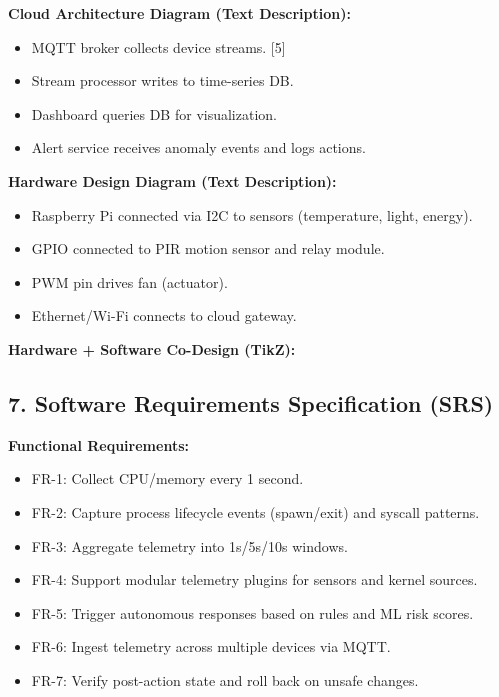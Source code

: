 \documentclass[11pt]{article}
\begin{document}
\textbf{Cloud Architecture Diagram (Text Description):}
\begin{itemize}
    \item MQTT broker collects device streams. [5]
    \item Stream processor writes to time-series DB.
    \item Dashboard queries DB for visualization.
    \item Alert service receives anomaly events and logs actions.
\end{itemize}

\textbf{Hardware Design Diagram (Text Description):}
\begin{itemize}
    \item Raspberry Pi connected via I2C to sensors (temperature, light, energy).
    \item GPIO connected to PIR motion sensor and relay module.
    \item PWM pin drives fan (actuator).
    \item Ethernet/Wi-Fi connects to cloud gateway.
\end{itemize}

\textbf{Hardware + Software Co-Design (TikZ):}
\begin{center}
\end{center}

\subsection{7. Software Requirements Specification (SRS)}
\textbf{Functional Requirements:}
\begin{itemize}
    \item FR-1: Collect CPU/memory every 1 second.
    \item FR-2: Capture process lifecycle events (spawn/exit) and syscall patterns.
    \item FR-3: Aggregate telemetry into 1s/5s/10s windows.
    \item FR-4: Support modular telemetry plugins for sensors and kernel sources.
    \item FR-5: Trigger autonomous responses based on rules and ML risk scores.
    \item FR-6: Ingest telemetry across multiple devices via MQTT.
    \item FR-7: Verify post-action state and roll back on unsafe changes.
\end{itemize}
\end{document}

